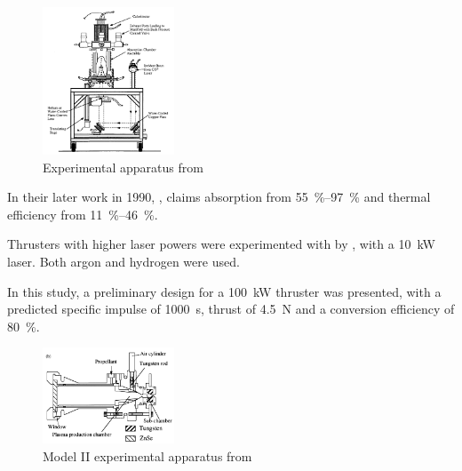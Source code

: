         \begin{figure}[h]
            \centering
            \includegraphics[width=0.35\textwidth]{assets/2 background/Illinois (Krier) Apparatus.png}
            \caption{Experimental apparatus from \textcite{zerkleLasersustainedArgonPlasmas1990}}
            \label{fig:Krier apparatus}
        \end{figure}

        In their later work in 1990, \textcite{zerkleLasersustainedArgonPlasmas1990}, claims absorption from \qtyrange{55}{97}{\%} and thermal efficiency from \qtyrange{11}{46}{\%}. %


        Thrusters with higher laser powers were experimented with by \textcite{blackLaserPropulsion10kW1995}, with a \qty{10}{kW}  laser. Both argon and hydrogen were used.

        In this study, a preliminary design for a \qty{100}{kW} thruster was presented, with a predicted specific impulse of \qty{1000}{s}, thrust of \qty{4.5}{N} and a conversion efficiency of \qty{80}{\%}.

        \textcite{toyodaThrustPerformanceCW2002}

        \begin{figure}[h]
            \centering
            \includegraphics[width=0.35\textwidth]{assets/2 background/Toyoda Apparatus.png}
            \caption{Model II experimental apparatus from \textcite{toyodaThrustPerformanceCW2002}}
            \label{fig:Toyoda apparatus}
        \end{figure}

